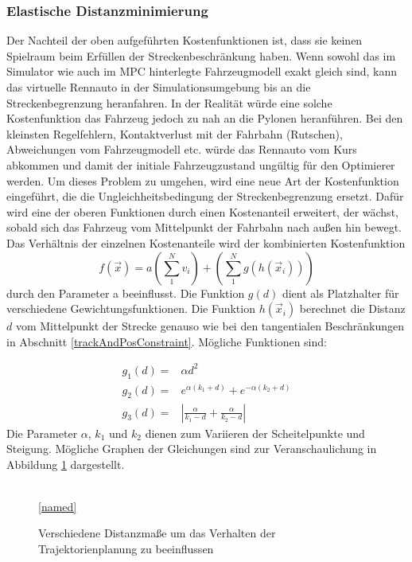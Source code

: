 \documentclass{like}
\begin{document}
\subsubsection*{Elastische Distanzminimierung}
Der Nachteil der oben aufgeführten Kostenfunktionen ist, dass sie keinen Spielraum beim Erfüllen der Streckenbeschränkung haben. 
Wenn sowohl das im Simulator wie auch im  \ac{MPC} hinterlegte Fahrzeugmodell exakt gleich sind, kann das virtuelle Rennauto in der Simulationsumgebung bis an die Streckenbegrenzung heranfahren. In der Realität würde eine solche Kostenfunktion das Fahrzeug jedoch zu nah an die Pylonen heranführen. Bei den kleinsten Regelfehlern, Kontaktverlust mit der Fahrbahn (Rutschen), Abweichungen vom Fahrzeugmodell etc. würde das Rennauto vom Kurs abkommen und damit der initiale Fahrzeugzustand ungültig für den Optimierer werden. Um dieses Problem zu umgehen, wird eine neue Art der Kostenfunktion eingeführt, die die Ungleichheitsbedingung der Streckenbegrenzung ersetzt. Dafür wird eine der oberen Funktionen durch einen Kosten\-an\-teil erweitert, der wächst, sobald sich das Fahrzeug vom Mittelpunkt der Fahrbahn nach außen hin bewegt. Das Verhältnis der einzelnen Kosten\-an\-tei\-le wird der kombinierten Kostenfunktion  
\begin{equation}
	f(\vec{x}) = a \left(\sum_{1}^{N} v_i \right) + \left(\sum_{1}^{N} g \left(h \left(\vec{x}_i \right) \right) \right)
\end{equation}
durch den Parameter a beeinflusst. 
Die Funktion $g(d)$ dient als Platzhalter für verschiedene Gewichtungsfunktionen. Die Funktion $h(\vec{x}_i)$ berechnet die Distanz \(d\) vom Mittelpunkt der Strecke genauso wie bei den tangentialen Beschränkungen in Abschnitt \ref{trackAndPosConstraint}. Mögliche Funktionen sind:

\begin{eqnarray}
	g_1(d) = &\alpha d^2 \\
	g_2(d) = &e^{\alpha (k_1 + d)} + e^{-\alpha(k_2 + d)} \label{eq:distMeasure1}\\
	g_3(d) = &|\frac{\alpha}{k_1-d} + \frac{\alpha}{k_2 - d}| \label{eq:distMeasure2}
\end{eqnarray}
Die Parameter $\alpha$, $k_1$ und $k_2$ dienen zum Variieren der Scheitelpunkte und Steigung.
Mögliche Graphen der Gleichungen sind zur Veranschaulichung in Abbildung \ref{fig:elasticCost} dar\-ge\-stel\-lt.

\begin{figure}[ht!]
	\centering
	 
	\\
	\ref{named}
	\caption{Verschiedene Distanzmaße um das Verhalten der Trajektorienplanung zu beeinflussen}
	\label{fig:elasticCost}
\end{figure}
\end{document}
